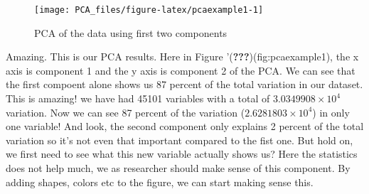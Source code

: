 \documentclass[
]{book}
\newenvironment{Shaded}{\begin{snugshade}}{\end{snugshade}}
\newcommand{\CommentTok}[1]{\textcolor[rgb]{0.56,0.35,0.01}{\textit{#1}}}
\newcommand{\DataTypeTok}[1]{\textcolor[rgb]{0.13,0.29,0.53}{#1}}
\newcommand{\DecValTok}[1]{\textcolor[rgb]{0.00,0.00,0.81}{#1}}
\newcommand{\KeywordTok}[1]{\textcolor[rgb]{0.13,0.29,0.53}{\textbf{#1}}}
\newcommand{\NormalTok}[1]{#1}
\newcommand{\OperatorTok}[1]{\textcolor[rgb]{0.81,0.36,0.00}{\textbf{#1}}}
\newcommand{\StringTok}[1]{\textcolor[rgb]{0.31,0.60,0.02}{#1}}
\theoremstyle{definition}
\theoremstyle{definition}
\theoremstyle{definition}
\theoremstyle{remark}
\begin{document}
\begin{Shaded}
\end{Shaded}

\begin{figure}

{\centering \texttt{[image: PCA\_files/figure-latex/pcaexample1-1]} 

}

\caption{PCA of the data using first two components}\label{fig:pcaexample1}
\end{figure}

Amazing. This is our PCA results. Here in Figure '({\textbf{???}})(fig:pcaexample1), the x axis is component 1 and the y axis is component 2 of the PCA. We can see that the first compoent alone shows us 87 percent of the total variation in our dataset. This is amazing! we have had 45101 variables with a total of \ensuremath{3.0349908\times 10^{4}} variation. Now we can see 87 percent of the variation (\ensuremath{2.6281803\times 10^{4}}) in only one variable! And look, the second component only explains 2 percent of the total variation so it's not even that important compared to the fist one. But hold on, we first need to see what this new variable actually shows us? Here the statistics does not help much, we as researcher should make sense of this component. By adding shapes, colors etc to the figure, we can start making sense this.
\end{document}
